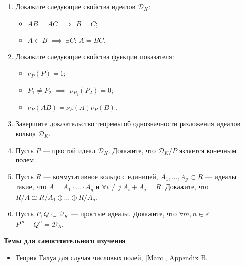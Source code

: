 \begin{enumerate}[topsep=0pt]
    \item Докажите следующие свойства идеалов $\mathcal{D}_K$:
    \begin{itemize}[noitemsep,topsep=0pt]
        \item $AB=AC$ $\implies$ $B=C$;
        \item $A\subset B$ $\implies$ $\exists C$: $A=BC$.
    \end{itemize} %
    \item Докажите следующие свойства функции показателя:
    \begin{itemize}[noitemsep,topsep=0pt]
        \item $\nu_P(P)=1$;
        \item $P_1\neq P_2$ $\implies$ $\nu_{P_1}(P_2)=0$;
        \item $\nu_P(AB) = \nu_P(A)\nu_P(B)$.
    \end{itemize} %
    \item Завершите доказательство теоремы об однозначности разложения идеалов кольца $\mathcal{D}_K$. %
    \item Пусть $P$ --- простой идеал $\mathcal{D}_K$. Докажите, что $\mathcal{D}_K/P$ является конечным полем. %
    \item Пусть $R$ --- коммутативное кольцо с единицей, $A_1,\dots,A_g \subset R$ --- идеалы такие, что $A=A_1\cdot\dots\cdot A_g$ и $\forall i\neq j$ $A_i+A_j=R$. Докажите, что $R/A\cong R/A_1 \oplus \dots \oplus R/A_g$.
    \item Пусть $P,Q \subset \mathcal{D}_K$ --- простые идеалы. Докажите, что $\forall m,n \in\mathbb{Z}_+$ $P^m+Q^n=\mathcal{D}_K$.
\end{enumerate}


\noindent\textbf{Темы для самостоятельного изучения}
\begin{itemize}[topsep=0pt]
    \item Теория Галуа для случая числовых полей, [Marc], Appendix B.
\end{itemize}